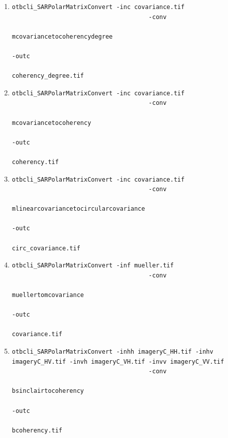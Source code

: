 \begin{enumerate}
\item 
\begin{verbatim} 
otbcli_SARPolarMatrixConvert -inc covariance.tif 
									  -conv
                                                                          mcovariancetocoherencydegree
                                                                          -outc
                                                                          coherency_degree.tif 
\end{verbatim}
									  
\item 
\begin{verbatim} 
otbcli_SARPolarMatrixConvert -inc covariance.tif 
									  -conv
                                                                          mcovariancetocoherency
                                                                          -outc
                                                                          coherency.tif 
\end{verbatim}
									  
\item 
\begin{verbatim} 
otbcli_SARPolarMatrixConvert -inc covariance.tif 
									  -conv
                                                                          mlinearcovariancetocircularcovariance
                                                                          -outc
                                                                          circ_covariance.tif 
\end{verbatim}	
									  			
\item 
\begin{verbatim} 
otbcli_SARPolarMatrixConvert -inf mueller.tif 
									  -conv
                                                                          muellertomcovariance
                                                                          -outc
                                                                          covariance.tif 
\end{verbatim}	
									  								  
\item 
\begin{verbatim} 
otbcli_SARPolarMatrixConvert -inhh imageryC_HH.tif -inhv imageryC_HV.tif -invh imageryC_VH.tif -invv imageryC_VV.tif
									  -conv
                                                                          bsinclairtocoherency
                                                                          -outc
                                                                          bcoherency.tif 
\end{verbatim}
									  

\end{enumerate}

